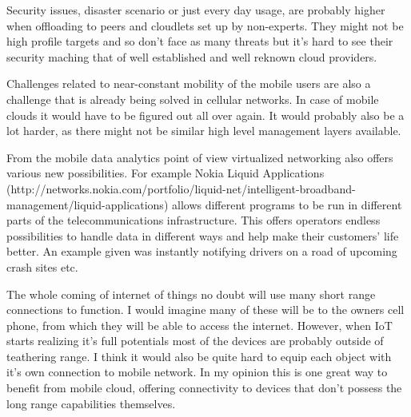 \documentclass[conference]{IEEEtran}
\begin{document}
\par
Security issues, disaster scenario or just every day usage, are probably higher when offloading to peers and cloudlets set up by non-experts. They might not be high profile targets and so don't face as many threats but it's hard to see their security maching that of well established and well reknown cloud providers.
\par
Challenges related to near-constant mobility of the mobile users are also a challenge that is already being solved in cellular networks. In case of mobile clouds it would have to be figured out all over again. It would probably also be a lot harder, as there might not be similar high level management layers available.
\par
From the mobile data analytics point of view virtualized networking also offers various new possibilities. For example Nokia Liquid Applications (http://networks.nokia.com/portfolio/liquid-net/intelligent-broadband-management/liquid-applications) allows different programs to be run in different parts of the telecommunications infrastructure. This offers operators endless possibilities to handle data in different ways and help make their customers' life better. An example given was instantly notifying drivers on a road of upcoming crash sites etc.
\par
The whole coming of internet of things no doubt will use many short range connections to function. I would imagine many of these will be to the owners cell phone, from which they will be able to access the internet. However, when IoT starts realizing it's full potentials most of the devices are probably outside of teathering range. I think it would also be quite hard to equip each object with it's own connection to mobile network. In my opinion this is one great way to benefit from mobile cloud, offering connectivity to devices that don't possess the long range capabilities themselves.
\end{document}
